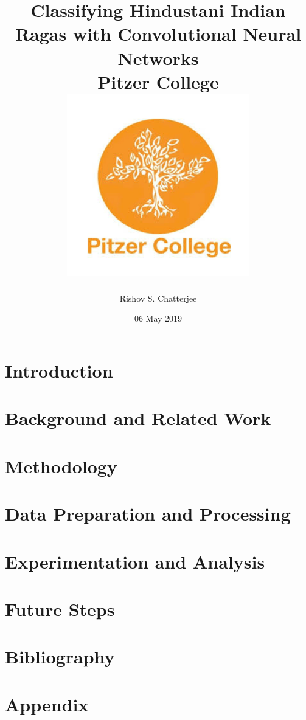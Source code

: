 \documentclass[12pt]{report}
\title{
{Classifying Hindustani Indian Ragas with Convolutional Neural Networks}\\
{\large Pitzer College}\\
{\includegraphics{university_1.png}}
}
\author{Rishov S. Chatterjee}
\date{06 May 2019}
\begin{document}
\maketitle{}
\chapter{Introduction}


\chapter{Background and Related Work}


\chapter{Methodology}


\chapter{Data Preparation and Processing}


\chapter{Experimentation and Analysis} 


\chapter{Future Steps}


\chapter{Bibliography}


\chapter{Appendix}

\end{document}
